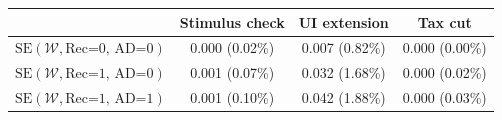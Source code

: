 \begin{tabular}{@{}lccc@{}}
\toprule
                          & Stimulus check      & UI extension    & Tax cut    \\  \midrule
$\mathrm{SE}(\mathcal{W}, \text{Rec=0, AD=0})$ & 0.000 (0.02\%)  & 0.007 (0.82\%)  & 0.000 (0.00\%)     \\
$\mathrm{SE}(\mathcal{W}, \text{Rec=1, AD=0})$ & 0.001 (0.07\%)  & 0.032 (1.68\%)  & 0.000 (0.02\%)     \\
$\mathrm{SE}(\mathcal{W}, \text{Rec=1, AD=1})$ & 0.001 (0.10\%)  & 0.042 (1.88\%)  & 0.000 (0.03\%)     \\ \bottomrule
\end{tabular}
